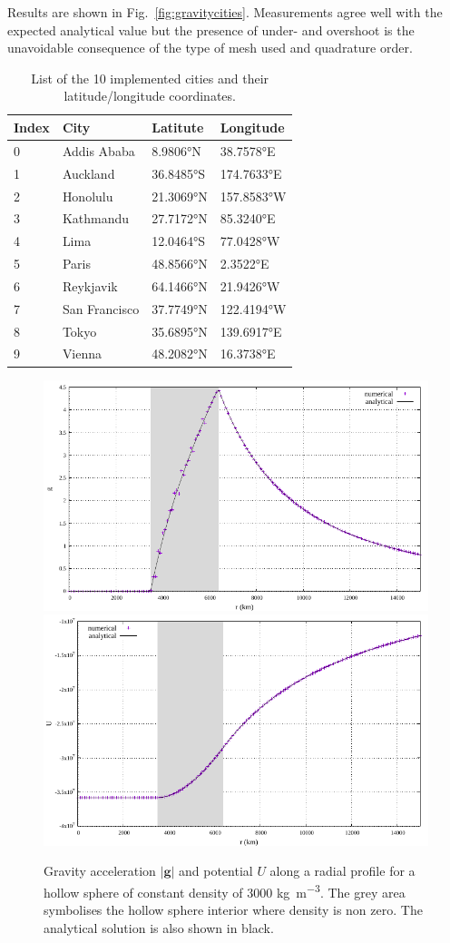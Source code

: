 Results are shown in Fig.~\ref{fig:gravitycities}. Measurements agree well with the expected analytical value but the presence of under- and overshoot is the unavoidable consequence of the type of mesh used and quadrature order.
  
\begin{table}
\centering
\begin{tabular}{llll}
\hline
Index & City & Latitute & Longitude \\
\hline\hline
 0 & Addis Ababa &8.9806\si{\degree}N & 38.7578\si{\degree}E \\
 1 & Auckland & 36.8485\si{\degree}S & 174.7633\si{\degree}E \\
 2 & Honolulu &21.3069\si{\degree}N & 157.8583\si{\degree}W \\
 3 & Kathmandu &27.7172\si{\degree}N & 85.3240\si{\degree}E \\
 4 & Lima &12.0464\si{\degree}S & 77.0428\si{\degree}W \\
 5 & Paris & 48.8566\si{\degree}N & 2.3522\si{\degree}E \\
 6 & Reykjavik & 64.1466\si{\degree}N & 21.9426\si{\degree}W \\
 7 & San Francisco & 37.7749\si{\degree}N & 122.4194\si{\degree}W \\ 
 8 & Tokyo & 35.6895\si{\degree}N & 139.6917\si{\degree}E \\
 9 & Vienna &48.2082\si{\degree}N & 16.3738\si{\degree}E \\
\hline
\end{tabular}
\caption{List of the 10 implemented cities and their latitude/longitude coordinates.}
\label{tab:cities}
\end{table}

\begin{figure}[h!]
\centering
\includegraphics[width=0.48\linewidth]{../../benchmarks/gravity_prem/doc/profile_gravity_const_g.pdf}
\includegraphics[width=0.48\linewidth]{../../benchmarks/gravity_prem/doc/profile_gravity_const_U.pdf}
\caption{Gravity acceleration $|{\mathbf g}|$ and potential $U$ along a radial profile for a hollow sphere of constant density of 3000 \si{\kilogram\per\cubic\metre}. The grey area symbolises the hollow sphere interior where density is non zero. The analytical solution is also shown in black.}
\label{fig:gravityline}
\end{figure}

